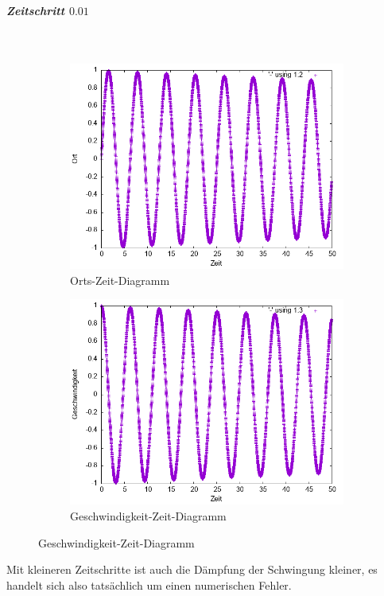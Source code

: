 \documentclass[
    oneside,
    ngerman,
    footinclude=false,
    captions=tableheading,
    DIV=12
]{scrartcl}
\begin{document}
            \subparagraph*{Zeitschritt $0.01$}\,
            \begin{figure}[H]
                \centering
                \begin{subfigure}[b]{0.45\textwidth}
                    \centering
                    \includegraphics[width=\textwidth]{Bilddateien/LLA1(a)-001-0-x.png}
                    \caption{Orts-Zeit-Diagramm}
                    \label{fig:LLA1(a)-001-0-x}
                \end{subfigure}
                \hfill
                \begin{subfigure}[b]{0.45\textwidth}
                    \centering
                    \includegraphics[width=\textwidth]{Bilddateien/LLA1(a)-001-0-v.png}
                    \caption{Geschwindigkeit-Zeit-Diagramm}
                    \label{fig:LLA1(a)-001-0-v}
                \end{subfigure}
            \end{figure}
            Mit kleineren Zeitschritte ist auch die Dämpfung der Schwingung kleiner, es handelt sich also tatsächlich um einen numerischen Fehler.
            
\end{document}

